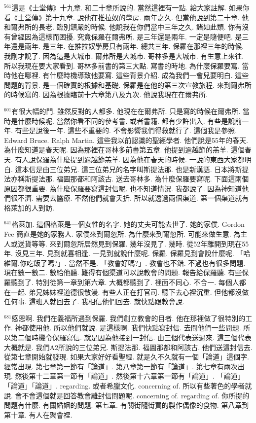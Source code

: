 \documentclass{book}
\begin{document}
$^{561}$這是《士堂傳》十九章.
和二十章所說的.
當然這裡有一點.
給大家註解.
如果你看《士堂傳》第十九章.
說他在推拉奴的學房.
兩年之久.
但當他說到第二十章.
他和爾弗所的長老.
臨別鎮嚴的時候.
他說我在你們當中三年之久.
諸如此類.
你有沒有曾經因為這樣而困擾.
究竟保羅在爾弗所.
是三年還是兩年.
一定是隨便吧.
是三年還是兩年.
是三年.
在推拉奴學房只有兩年.
總共三年.
保羅在那裡三年的時候.
我剛才說了.
因為這是大城市.
爾弗所是大城市.
哥林多是大城市.
有生意上來往.
所以我現在要大家看到.
哥林多前書的第三大點.
寫書的時地.
為什麼保羅要寫.
當時他在哪裡.
有什麼時機導致他要寫.
這些背景介紹.
成為我們一會兒要明白.
這些問題的背景.
是一個確實的根據和基礎.
保羅是在他的第三次宣教旅程.
來到爾弗所的時候寫的.
因為根據臨前十六章第八及九次.
他說我現在在爾弗所.

$^{601}$有很大幅的門.
雖然反對的人都多.
他現在在爾弗所.
只是寫的時候在爾弗所.
當時是什麼時候呢.
當然你看不同的參考書.
或者書籍.
都有少許出入.
有些是說前一年.
有些是說後一年.
這些不重要的.
不會影響我們得救就行了.
這個我是參照.
Edward Bruce.
Ralph Martin.
這些我以前認識的聖經學者.
他們說是55年的春天.
為什麼知道是春天呢.
因為那裡在哥林多前書第五章.
他提到逾越節的羔羊.
這個春天.
有人說保羅為什麼提到逾越節羔羊.
因為他在春天的時候.
一說的東西大家都明白.
這本信是由三位弟兄.
這三位弟兄的名字叫斯提法那.
也是新漢語.
日本將斯提法亦稱斯提法那.
福圖那都和阿該古.
送去哥林多.
為什麼保羅要寫呢.
下面這兩個原因都很重要.
為什麼保羅要寫這封信呢.
也不知道情況.
我都說了.
因為神知道他們很不濟.
需要去醫療.
不然他們就會夭折.
所以就透過兩個渠道.
第一個渠道就有格萊加的人到訪.

$^{641}$格萊加.
這個格萊是一個女性的名字.
她的丈夫可能去世了.
她的家僕.
Gordon Fee 簡直是她的家務人.
家僕來到爾忽所.
為什麼來到爾忽所.
可能來做生意.
為主人或送貨等等.
來到爾忽所居然見到保羅.
幾年沒見了.
幾時.
從52年離開到現在55年.
沒見三年.
見到就喜相逢.
一見到就說什麼呢.
保羅.
保羅見到會說什麼呢.
「哈維爾,你吃飯了嗎?」.
當然不是.
「教會好嗎?」.
教會也不錯.
不過也有很多問題.
現在數一數二.
數給他聽.
難得有個渠道可以說教會的問題.
報告給保羅聽.
有些保羅聽到了.
特別從第一章到第六章.
大概都聽到了.
裡面不同心.
不合一.
每個人都在一起.
弟兄姊妹裡道德很散漫.
有些人正在打官司.
聽下去心裡沉重.
但他都沒做任何事.
這班人就回去了.
我相信他們回去.
就快點跟教會說.

$^{681}$感恩啊.
我們在義福所遇到保羅.
我們創立教會的目者.
他在那裡做了很特別的工作.
神都使用他.
所以他們就說.
是這樣啊.
我們快點寫封信.
去問他們一些問題.
所以第二個時機令保羅寫信.
就是因為他接到一封信.
由三個代表送過來.
這三個代表大概就是.
我們A2所說的三位弟兄.
斯提法那.
福圖那都和阿該古.
他們送這封信去.
從第七章開始就發現.
如果大家好好看聖經.
就是久不久就有一個「論道」這個字.
經常出現.
第七章第一節有「論道」.
第八章第一節有「論道」.
第七章有兩次出現.
然後第十二章第一節有「論道」.
然後第十六章第一節有「論道」.
「論道」「論道」「論道」.
regarding.
或者希臘文化.
concerning of.
所以有些著色的學者就說.
會不會這個就是回答教會離封信問題呢.
concerning of.
regarding of.
你所提的問題有什麼.
有關婚姻的問題.
第七章.
有關街隨街買的製作偶像的食物.
第八章到第十章.
有人在聚會裡.
\end{document}
